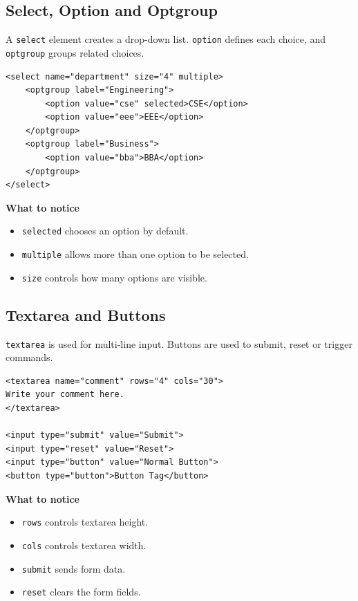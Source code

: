 \subsection{Select, Option and Optgroup}
A \texttt{select} element creates a drop-down list. \texttt{option} defines each choice, and \texttt{optgroup} groups related choices.

\begin{lstlisting}[style=htmlide, caption={Drop-down and Option Group}]
<select name="department" size="4" multiple>
    <optgroup label="Engineering">
        <option value="cse" selected>CSE</option>
        <option value="eee">EEE</option>
    </optgroup>
    <optgroup label="Business">
        <option value="bba">BBA</option>
    </optgroup>
</select>
\end{lstlisting}

\textbf{What to notice}
\begin{itemize}
    \item \texttt{selected} chooses an option by default.
    \item \texttt{multiple} allows more than one option to be selected.
    \item \texttt{size} controls how many options are visible.
\end{itemize}

\subsection{Textarea and Buttons}
\texttt{textarea} is used for multi-line input. Buttons are used to submit, reset or trigger commands.

\begin{lstlisting}[style=htmlide, caption={Textarea and Buttons}]
<textarea name="comment" rows="4" cols="30">
Write your comment here.
</textarea>

<input type="submit" value="Submit">
<input type="reset" value="Reset">
<input type="button" value="Normal Button">
<button type="button">Button Tag</button>
\end{lstlisting}

\textbf{What to notice}
\begin{itemize}
    \item \texttt{rows} controls textarea height.
    \item \texttt{cols} controls textarea width.
    \item \texttt{submit} sends form data.
    \item \texttt{reset} clears the form fields.
\end{itemize}

